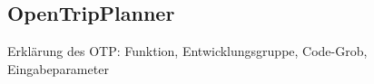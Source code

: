 \subsection{OpenTripPlanner}
Erklärung des OTP: Funktion, Entwicklungsgruppe, Code-Grob, Eingabeparameter
